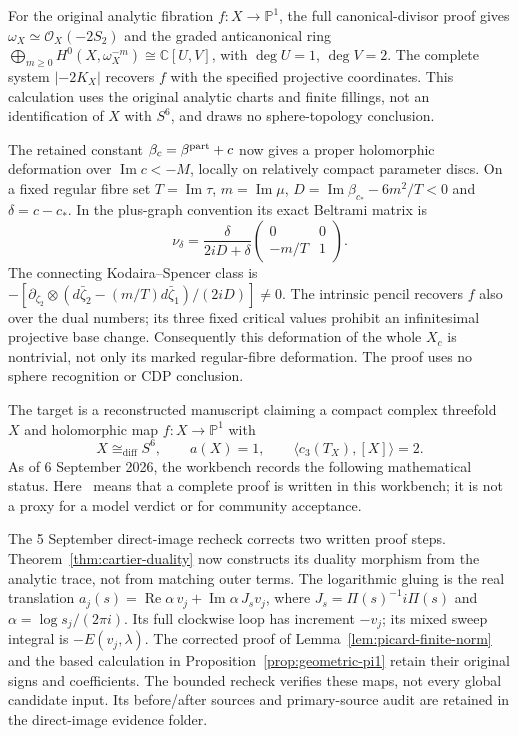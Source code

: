 For the original analytic fibration $f:X\to\mathbb P^1$, the full
canonical-divisor proof gives
$\omega_X\simeq\mathcal O_X(-2S_2)$ and the graded anticanonical ring
$\bigoplus_{m\ge0}H^0(X,\omega_X^{-m})\cong\mathbb C[U,V]$,
with $\deg U=1$, $\deg V=2$. The complete system $|-2K_X|$
recovers $f$ with the specified projective coordinates. This calculation
uses the original analytic charts and finite fillings, not an
identification of $X$ with $S^6$, and draws no sphere-topology conclusion.

The retained constant $\beta_c=\beta^{\rm part}+c$ now gives a proper
holomorphic deformation over $\operatorname{Im}c<-M$, locally on
relatively compact parameter discs. On a fixed regular fibre set
$T=\operatorname{Im}\tau$, $m=\operatorname{Im}\mu$,
$D=\operatorname{Im}\beta_{c_*}-6m^2/T<0$ and $\delta=c-c_*$.
In the plus-graph convention its exact Beltrami matrix is
\[
 \nu_\delta=\frac{\delta}{2iD+\delta}
                 \begin{pmatrix}0&0\\-m/T&1\end{pmatrix}.
\]
The connecting Kodaira--Spencer class is
$-[\partial_{\zeta_2}\otimes
(d\bar\zeta_2-(m/T)d\bar\zeta_1)/(2iD)]\ne0$.
The intrinsic pencil recovers $f$ also over the dual numbers; its three
fixed critical values prohibit an infinitesimal projective base change.
Consequently this deformation of the whole $X_c$ is nontrivial,
not only its marked regular-fibre deformation. The proof uses no sphere
recognition or CDP conclusion.



The target is a reconstructed manuscript claiming a compact complex
threefold \(X\) and holomorphic map \(f:X\to\mathbb P^1\) with
\[
X\cong_{\mathrm{diff}}S^6,\qquad a(X)=1,\qquad
\langle c_3(T_X),[X]\rangle=2.
\]
As of 6 September 2026, the workbench records the following mathematical
status.  Here \Verified\ means that a complete proof is written in this
workbench; it is not a proxy for a model verdict or for community acceptance.

The 5 September direct-image recheck corrects two written proof steps.
Theorem~\ref{thm:cartier-duality} now constructs its duality morphism
from the analytic trace, not from matching outer terms. The logarithmic
gluing is the real translation
$a_j(s)=\operatorname{Re}\alpha\,v_j+\operatorname{Im}\alpha\,J_sv_j$,
where $J_s=\Pi(s)^{-1}i\Pi(s)$ and $\alpha=\log s_j/(2\pi i)$.
Its full clockwise loop has increment $-v_j$; its mixed sweep integral
is $-E(v_j,\lambda)$. The corrected proof of
Lemma~\ref{lem:picard-finite-norm} and the based calculation in
Proposition~\ref{prop:geometric-pi1} retain their original signs and
coefficients. The bounded recheck verifies these maps, not every
global candidate input. Its before/after sources and primary-source
audit are retained in the direct-image evidence folder.


